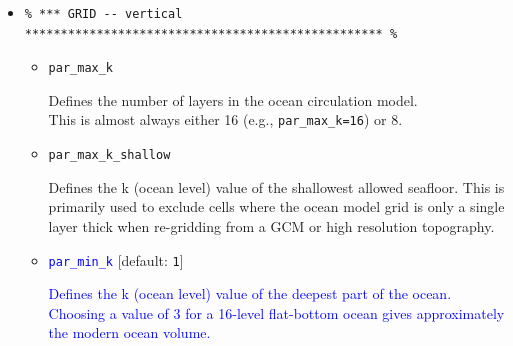 \begin{itemize}
\begin{itemize}[noitemsep]
\vspace{1mm}
\item \texttt{opt\_equalarea} [default: \texttt{true}]

This specifies whether or not an equal area grid is used/assumed. (A value of \texttt{false} results in the latitude grid being defined in equal increments of latitude).

\vspace{1mm}
\item \texttt{par\_lon\_off} [default: \texttt{-180.0}]

This specifies the longitude offset of the model grid. The basic modern configurations have an offset of \texttt{-260.0}. The standard paleo value is \texttt{-180.0}.

\end{itemize}

\vspace{2mm}
\item []
\small\vspace{-2pt}\begin{verbatim}
% *** GRID -- vertical ************************************************** %
\end{verbatim}\vspace{-2pt}\normalsize

\begin{itemize}[noitemsep]

\vspace{1mm}
\item \texttt{par\_max\_k}

Defines the number of  layers in the ocean circulation model.
\\This is almost always either 16 (e.g., \texttt{par\_max\_k=16}) or 8.

\vspace{1mm}
\item \texttt{par\_max\_k\_shallow}

Defines the k (ocean level) value of the shallowest allowed seafloor. This is primarily used to exclude cells where the ocean model grid is only a single layer thick when re-gridding from a GCM or high resolution topography.

\vspace{1mm}
\item \textcolor{blue}{\texttt{par\_min\_k}} [default: \texttt{1}]

\textcolor{blue}{Defines the k (ocean level) value of the deepest part of the ocean. Choosing a value of 3 for a 16-level flat-bottom ocean gives approximately the modern ocean volume.}


\end{itemize}
\end{itemize}

